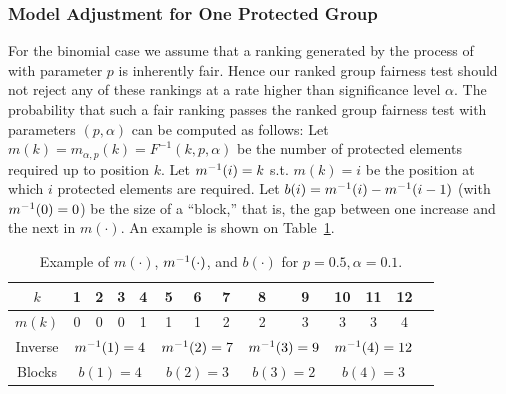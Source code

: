 \subsubsection{Model Adjustment for One Protected Group}
For the binomial case we assume that a ranking generated by the process of~\citet{yang2016measuring} with parameter $p$ is inherently fair.
%
Hence our ranked group fairness test should not reject any of these rankings at a rate higher than significance level $\alpha$.
%
The probability that such a fair ranking passes the ranked group fairness test with parameters $(p,\alpha)$ can be computed as follows:
%
Let $m(k) = m_{\alpha,p}(k) = F^{-1}(k,p,\alpha)$ be the number of protected elements required up to position $k$.
%
Let $m^{-1}(i) = k$ s.t. $m(k) = i$ be the position at which $i$ protected elements are required.
%
Let $b(i) = m^{-1}(i) - m^{-1}(i-1)$ (with $m^{-1}(0) = 0$) be the size of a ``block,'' that is, the gap between one increase and the next in $m(\cdot)$.
%
An example is shown on Table~\ref{tbl:example_mtable}.
%
\begin{table}[h]
	\caption{Example of $m(\cdot)$, $m^{-1}(\cdot)$, and $b(\cdot)$ for $p=0.5, \alpha=0.1$.}
	\vspace{-3mm}
	\label{tbl:example_mtable}
	{\small
		\begin{tabular}{cccccccccccccc}\toprule
			$k$    & 1 & 2 & 3 & {\bf 4} & 5 & 6 & {\bf 7} & 8 & {\bf 9} & 10 & 11 & {\bf 12} \\
			\midrule
			$m(k)$ & 0 & 0 & 0 & \multicolumn{1}{c|}{1} & 1 & 1 & \multicolumn{1}{c|}{2} & 2 & \multicolumn{1}{c|}{3} & 3  & 3  & \multicolumn{1}{c}{4}\\
			Inverse   & \multicolumn{4}{c|}{$m^{-1}(1)=4$}
			& \multicolumn{3}{c|}{$m^{-1}(2)=7$}
			& \multicolumn{2}{c|}{$m^{-1}(3)=9$}
			& \multicolumn{3}{c}{$m^{-1}(4)=12$}\\
			Blocks       & \multicolumn{4}{c|}{$b(1)=4$}
			& \multicolumn{3}{c|}{$b(2)=3$}
			& \multicolumn{2}{c|}{$b(3)=2$}
			& \multicolumn{3}{c}{$b(4)=3$}\\\bottomrule
		\end{tabular}
	}
\end{table}

